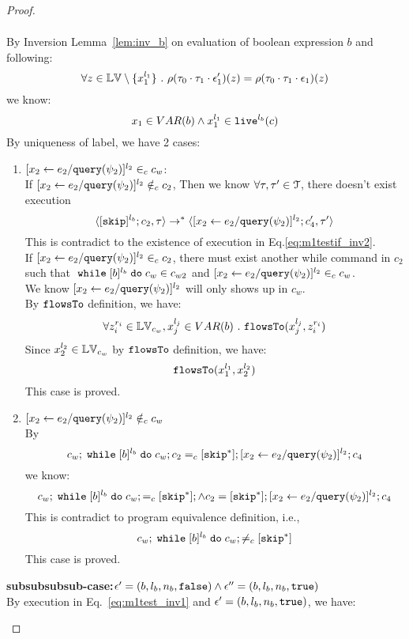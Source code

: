 {\begin{proof}
\begin{subproof}
\[\begin{array}{l}
\end{array}
 \]
By Inversion Lemma~\ref{lem:inv_b} on evaluation of boolean expression $b$ and following: 
\[
  \forall z \in \mathbb{LV} \setminus \{x_1^{l_1}\} ~.~
  \rho(\mathtt{\tau}_0 \cdot \mathtt{\tau}_1 \cdot \mathtt{\epsilon}_1')(z) = \rho(\mathtt{\tau}_0 \cdot \mathtt{\tau}_1 \cdot \mathtt{\epsilon}_1)(z)
\]
we know:
\[
  x_1 \in VAR(b) \land x_1^{l_1} \in \mathtt{live}^{l_b}(c)
\]
%
 By uniqueness of label, we have 2 cases:
 \begin{enumerate}
 \item $[\mathrel{ {x}_2 \leftarrow e_2 / {\tt query}(\psi_2) }]^{l_2} \in_c c_w$:
 \\
 If $[\mathrel{ {x}_2 \leftarrow e_2 / {\tt query}(\psi_2) }]^{l_2} \notin_c c_2$,
 Then we know $\forall \mathtt{\tau}, \mathtt{\tau}' \in \mathcal{T}$, there doesn't exist execution
 \[
  \langle [\mathtt{skip}]^{l_b};c_2, \mathtt{\tau} \rangle \rightarrow^{*} 
  \langle [\mathrel{ {x}_2 \leftarrow e_2 / {\tt query}(\psi_2) }]^{l_2};{c}_4', \mathtt{\tau}' \rangle
 \]
 This is contradict to the existence of execution in Eq.\ref{eq:m1testif_inv2}.
 \\
  If $[\mathrel{ {x}_2 \leftarrow e_2 / {\tt query}(\psi_2) }]^{l_2} \in_c c_2$, there must exist another while command
   in $c_2$ such that 
  $\;\mathtt{while}\; [b]^{l_b} \;\mathtt{do}\; c_w \in c_{w2}$ and $[\mathrel{ {x}_2 \leftarrow e_2 / {\tt query}(\psi_2) }]^{l_2} \in_c c_w$.
  \\
  We know $[\mathrel{ {x}_2 \leftarrow e_2 / {\tt query}(\psi_2) }]^{l_2}$ will only shows up in $c_w$.
  \\
  By $\mathtt{flowsTo}$ definition, we have:
  \[
    \forall z_i^{r_i} \in \mathbb{LV}_{c_w}, x_j^{l_j} \in VAR(b) ~.~
    \mathtt{flowsTo}(x_j^{l_j}, z_i^{r_i})
  \]
  Since $x_2^{l_2} \in \mathbb{LV}_{c_w}$ by $\mathtt{flowsTo}$ definition, we have: 
  \[
    \mathtt{flowsTo}(x_1^{l_1}, x_2^{l_2})
  \]
  This case is proved.
 \item $[\mathrel{ {x}_2 \leftarrow e_2 / {\tt query}(\psi_2) }]^{l_2} \notin_c c_w$
 \\
 By
 \[
  c_w;\;\mathtt{while}\; [b]^{l_b} \;\mathtt{do}\; c_w; c_2 =_c [\mathtt{skip}^*]; [\mathrel{ {x}_2 \leftarrow e_2 / {\tt query}(\psi_2) }]^{l_2};{c}_4
\]
we know:
\[
  c_w;\;\mathtt{while}\; [b]^{l_b} \;\mathtt{do}\; c_w; =_c [\mathtt{skip}^*]; \land c_2 = [\mathtt{skip}^*]; [\mathrel{ {x}_2 \leftarrow e_2 / {\tt query}(\psi_2) }]^{l_2};{c}_4
\]
This is contradict to program equivalence definition, i.e.,
\[
  c_w;\;\mathtt{while}\; [b]^{l_b} \;\mathtt{do}\; c_w; \neq_c [\mathtt{skip}^*]
\]
This case is proved.
%
 \end{enumerate}
%
\textbf{subsubsubsub-case:}$\mathtt{\epsilon}' = (b, l_b, n_b, \mathtt{false}) \land \mathtt{\epsilon}'' = (b, l_b, n_b, \mathtt{true})$
\\
By execution in Eq.~\ref{eq:m1test_inv1} and $\mathtt{\epsilon}' = (b, l_b, n_b, \mathtt{true})$, we have:

\end{subproof}
\end{proof}}
